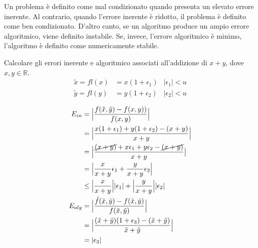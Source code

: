\documentclass{article}
\begin{document}
Un problema è definito come mal condizionato quando presenta un elevato errore inerente.
Al contrario, quando l'errore inerente è ridotto, il problema è definito come ben condizionato. 
D'altro canto, se un algoritmo produce un ampio errore algoritmico, viene
definito instabile.
Se, invece, l'errore algoritmico è minimo, l'algoritmo è definito come numericamente stabile.

\begin{example}
    Calcolare gli errori inerente e algoritmico associati all'addizione di
    $x+y$, dove $x,y\in \mathbb{R}$.
    \begin{equation*}
        \begin{aligned}
            \tilde{x}=fl(x) &= x(1+\epsilon_1) & |\epsilon_1| < u \\
            \tilde{y}=fl(y) &= y(1+\epsilon_2) & |\epsilon_2| < u \\
        \end{aligned} 
     \end{equation*}
    \begin{equation*}
       \begin{aligned}
           E_{in}&= \Big\lvert \frac{f(\tilde{x},\tilde{y})-f(x,y))}{f(x,y)}\Big\rvert\\
            &=\Big\lvert
           \frac{x(1+\epsilon_1)+y(1+\epsilon_2)-(x+y)}{x+y}\Big\rvert \\
                 &=\Big\lvert
                     \frac{\cancel{(x+y)}+x\epsilon_1+y\epsilon_2-\cancel{(x+y)}}{x+y}
                    \big\rvert \\ 
                &=\Big\lvert
                \frac{x}{x+y}\epsilon_1+\frac{y}{x+y}\epsilon_2\Big\rvert\\ 
                &\leq \Big\lvert \frac{x}{x+y}\Big\rvert \lvert
                \epsilon_1\rvert + \Big\lvert \frac{y}{x+y}\Big\rvert \lvert
                \epsilon_2\rvert\\
           E_{alg}&=\Big\lvert
           \frac{\tilde{f}(\tilde{x},\tilde{y})-f(\tilde{x},\tilde{y})}{f(\tilde{x},\tilde{y})}\Big\rvert
           \\ 
                &= \Big\lvert
                \frac{(\tilde{x}+\tilde{y})(1+\epsilon_3)-(\tilde{x}+\tilde{y})}{\tilde{x}+\tilde{y}}\Big\rvert\\
                &= \lvert \epsilon_3\rvert
       \end{aligned} 
    \end{equation*}
\end{example}
\end{document}
